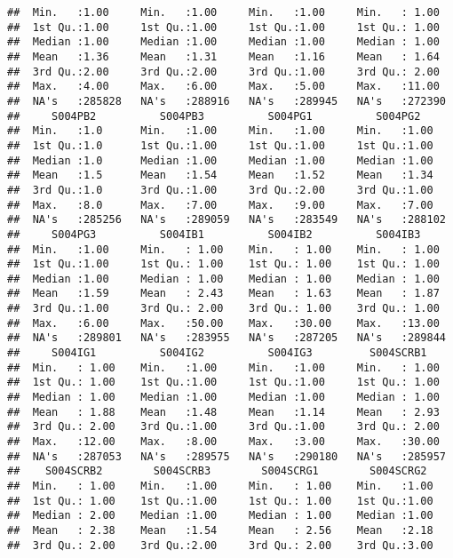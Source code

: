 \documentclass[
]{article}
\begin{document}
\begin{verbatim}
##  Min.   :1.00     Min.   :1.00     Min.   :1.00     Min.   : 1.00   
##  1st Qu.:1.00     1st Qu.:1.00     1st Qu.:1.00     1st Qu.: 1.00   
##  Median :1.00     Median :1.00     Median :1.00     Median : 1.00   
##  Mean   :1.36     Mean   :1.31     Mean   :1.16     Mean   : 1.64   
##  3rd Qu.:2.00     3rd Qu.:2.00     3rd Qu.:1.00     3rd Qu.: 2.00   
##  Max.   :4.00     Max.   :6.00     Max.   :5.00     Max.   :11.00   
##  NA's   :285828   NA's   :288916   NA's   :289945   NA's   :272390  
##     S004PB2          S004PB3          S004PG1          S004PG2      
##  Min.   :1.0      Min.   :1.00     Min.   :1.00     Min.   :1.00    
##  1st Qu.:1.0      1st Qu.:1.00     1st Qu.:1.00     1st Qu.:1.00    
##  Median :1.0      Median :1.00     Median :1.00     Median :1.00    
##  Mean   :1.5      Mean   :1.54     Mean   :1.52     Mean   :1.34    
##  3rd Qu.:1.0      3rd Qu.:1.00     3rd Qu.:2.00     3rd Qu.:1.00    
##  Max.   :8.0      Max.   :7.00     Max.   :9.00     Max.   :7.00    
##  NA's   :285256   NA's   :289059   NA's   :283549   NA's   :288102  
##     S004PG3          S004IB1          S004IB2          S004IB3      
##  Min.   :1.00     Min.   : 1.00    Min.   : 1.00    Min.   : 1.00   
##  1st Qu.:1.00     1st Qu.: 1.00    1st Qu.: 1.00    1st Qu.: 1.00   
##  Median :1.00     Median : 1.00    Median : 1.00    Median : 1.00   
##  Mean   :1.59     Mean   : 2.43    Mean   : 1.63    Mean   : 1.87   
##  3rd Qu.:1.00     3rd Qu.: 2.00    3rd Qu.: 1.00    3rd Qu.: 1.00   
##  Max.   :6.00     Max.   :50.00    Max.   :30.00    Max.   :13.00   
##  NA's   :289801   NA's   :283955   NA's   :287205   NA's   :289844  
##     S004IG1          S004IG2          S004IG3         S004SCRB1     
##  Min.   : 1.00    Min.   :1.00     Min.   :1.00     Min.   : 1.00   
##  1st Qu.: 1.00    1st Qu.:1.00     1st Qu.:1.00     1st Qu.: 1.00   
##  Median : 1.00    Median :1.00     Median :1.00     Median : 1.00   
##  Mean   : 1.88    Mean   :1.48     Mean   :1.14     Mean   : 2.93   
##  3rd Qu.: 2.00    3rd Qu.:1.00     3rd Qu.:1.00     3rd Qu.: 2.00   
##  Max.   :12.00    Max.   :8.00     Max.   :3.00     Max.   :30.00   
##  NA's   :287053   NA's   :289575   NA's   :290180   NA's   :285957  
##    S004SCRB2        S004SCRB3        S004SCRG1        S004SCRG2     
##  Min.   : 1.00    Min.   :1.00     Min.   : 1.00    Min.   :1.00    
##  1st Qu.: 1.00    1st Qu.:1.00     1st Qu.: 1.00    1st Qu.:1.00    
##  Median : 2.00    Median :1.00     Median : 1.00    Median :1.00    
##  Mean   : 2.38    Mean   :1.54     Mean   : 2.56    Mean   :2.18    
##  3rd Qu.: 2.00    3rd Qu.:2.00     3rd Qu.: 2.00    3rd Qu.:3.00    

\end{verbatim}
\end{document}
